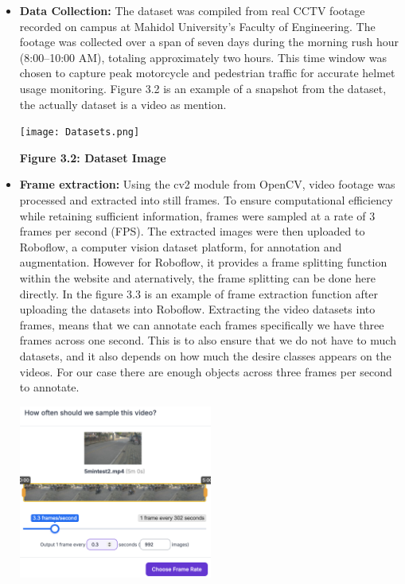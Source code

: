 \begin{itemize}
	\item \textbf{Data Collection:} The dataset was compiled from real CCTV footage recorded on campus at Mahidol University’s Faculty of Engineering. The footage was collected over a span of seven days during the morning rush hour (8:00–10:00 AM), totaling approximately two hours. This time window was chosen to capture peak motorcycle and pedestrian traffic for accurate helmet usage monitoring.  Figure 3.2 is an example of a snapshot from the dataset, the actually dataset is a video as mention.
	\begin{center}
		\texttt{[image: Datasets.png]}
		
		\vspace{0.5em}
		\textbf{Figure 3.2: Dataset Image}
	\end{center}
	
	\item \textbf{Frame extraction:} Using the cv2 module from OpenCV, video footage was processed and extracted into still frames. To ensure computational efficiency while retaining sufficient information, frames were sampled at a rate of 3 frames per second (FPS). The extracted images were then uploaded to Roboflow, a computer vision dataset platform, for annotation and augmentation. However for Roboflow, it provides a frame splitting function within the website and aternatively, the frame splitting can be done here directly. In the figure 3.3 is an example of frame extraction function after uploading the datasets into Roboflow. Extracting the video datasets into frames, means that we can annotate each frames specifically we have three frames across one second. This is to also ensure that we do not have to much datasets, and it also depends on how much the desire classes appears on the videos. For our case there are enough objects across three frames per second to annotate.
	\begin{center}
		\includegraphics[width=0.5\textwidth]{Frameex.png}
		

\end{center}
\end{itemize}
